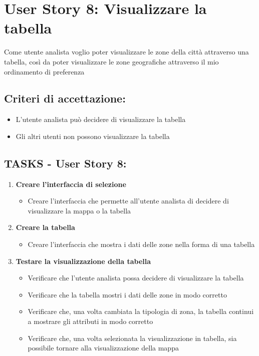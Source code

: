 \section*{User Story 8: Visualizzare la tabella}  
    Come utente analista voglio poter visualizzare le zone della città attraverso una tabella, così da poter visualizzare le zone geografiche attraverso il mio ordinamento di preferenza
    \subsection*{Criteri di accettazione:}  
    \begin{itemize}  
        \item L’utente analista può decidere di visualizzare la tabella
        \item Gli altri utenti non possono visualizzare la tabella
    \end{itemize}  
    \subsection*{TASKS - User Story 8:}  
    \begin{enumerate}  
        \item \textbf{Creare l'interfaccia di selezione}  
            \begin{itemize}  
                \item Creare l’interfaccia che permette all’utente analista di decidere di visualizzare la mappa o la tabella
            \end{itemize}  
        \item \textbf{Creare la tabella}  
            \begin{itemize}  
                \item Creare l'interfaccia che mostra i dati delle zone nella forma di una tabella 
            \end{itemize}  
        \item \textbf{Testare la visualizzazione della tabella}  
            \begin{itemize}  
                \item Verificare che l'utente analista possa decidere di visualizzare la tabella
                \item Verificare che la tabella mostri i dati delle zone in modo corretto
                \item Verificare che, una volta cambiata la tipologia di zona, la tabella continui a mostrare gli attributi in modo corretto
                \item Verificare che, una volta selezionata la visualizzazione in tabella, sia possibile tornare alla visualizzazione della mappa
            \end{itemize}  
    \end{enumerate}
